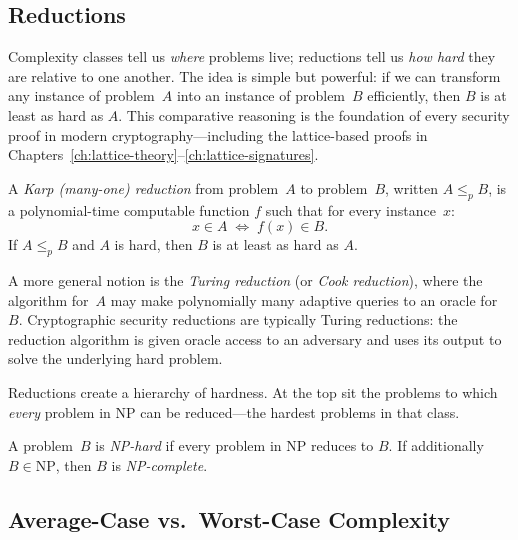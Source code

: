 \subsection{Reductions}
\label{subsec:reductions}

Complexity classes tell us \emph{where} problems live; reductions tell us \emph{how hard} they are relative to one another.  The idea is simple but powerful: if we can transform any instance of problem~$A$ into an instance of problem~$B$ efficiently, then $B$ is at least as hard as $A$.  This comparative reasoning is the foundation of every security proof in modern cryptography---including the lattice-based proofs in Chapters~\ref{ch:lattice-theory}--\ref{ch:lattice-signatures}.

\begin{definition}
\label{def:karp-reduction}
A \emph{Karp (many-one) reduction} from problem~$A$ to problem~$B$, written $A \leq_p B$, is a polynomial-time computable function $f$ such that for every instance~$x$:
\begin{equation}
x \in A \;\iff\; f(x) \in B.
\end{equation}
If $A \leq_p B$ and $A$ is hard, then $B$ is at least as hard as $A$.
\end{definition}

A more general notion is the \emph{Turing reduction} (or \emph{Cook reduction}), where the algorithm for~$A$ may make polynomially many adaptive queries to an oracle for~$B$.  Cryptographic security reductions are typically Turing reductions: the reduction algorithm is given oracle access to an adversary and uses its output to solve the underlying hard problem.

Reductions create a hierarchy of hardness.  At the top sit the problems to which \emph{every} problem in NP can be reduced---the hardest problems in that class.

\begin{definition}[NP-Hardness]
\label{def:np-hard}
A problem~$B$ is \emph{NP-hard} if every problem in NP reduces to $B$.  If additionally $B \in \mathrm{NP}$, then $B$ is \emph{NP-complete}.
\end{definition}


\subsection{Average-Case vs.\ Worst-Case Complexity}
\label{subsec:avg-worst}

